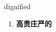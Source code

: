 
\begin{frame}
{\huge dignified}
\begin{center}
\begin{enumerate}\Large
  \item \textbf{高贵庄严的}
\end{enumerate}
\end{center}
\end{frame}
